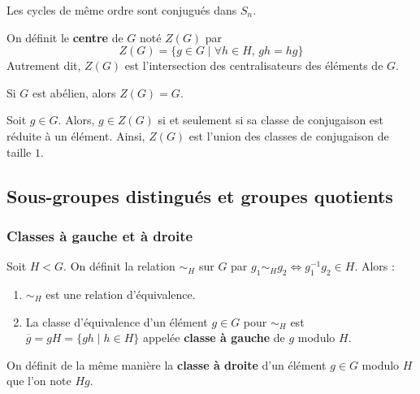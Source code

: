   \begin{example}
    Les cycles de même ordre sont conjugués dans $S_n$.
  \end{example}


  \begin{definition}
    On définit le \textbf{centre} de $G$ noté $Z(G)$ par
    \[ Z(G) = \{ g \in G \mid \forall h \in H, \, gh=hg \} \]
    Autrement dit, $Z(G)$ est l'intersection des centralisateurs des éléments de $G$.
  \end{definition}

  \begin{example}
    Si $G$ est abélien, alors $Z(G) = G$.
  \end{example}


  \begin{proposition}
    Soit $g \in G$. Alors, $g \in Z(G)$ si et seulement si sa classe de conjugaison est réduite à un élément.
    \newpar
    Ainsi, $Z(G)$ est l'union des classes de conjugaison de taille $1$.
  \end{proposition}

  \subsection{Sous-groupes distingués et groupes quotients}

  \subsubsection{Classes à gauche et à droite}


  \begin{proposition}
    \label{103-1}
    Soit $H < G$. On définit la relation $\sim_H$ sur $G$ par $g_1 \sim_H g_2 \iff g_1^{-1} g_2 \in H$. Alors :
    \begin{enumerate}[label={\bfseries(\roman*)}]
      \item $\sim_H$ est une relation d'équivalence.
      \item La classe d'équivalence d'un élément $g \in G$ pour $\sim_H$ est $\overline{g} = gH = \{ gh \mid h \in H \}$ appelée \textbf{classe à gauche} de $g$ modulo $H$.
    \end{enumerate}
  \end{proposition}

  \begin{remark}
    On définit de la même manière la \textbf{classe à droite} d'un élément $g \in G$ modulo $H$ que l'on note $Hg$.
  \end{remark}

